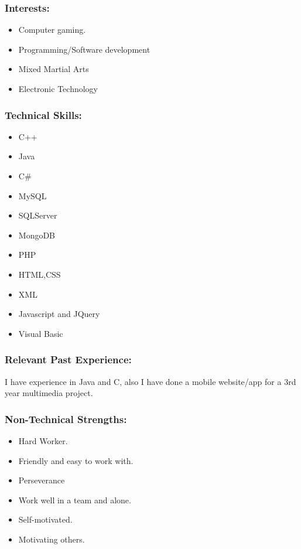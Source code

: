 \subsubsection{Interests:}
	\begin{itemize}
		\item Computer gaming.
		\item Programming/Software development
		\item Mixed Martial Arts
		\item Electronic Technology
	\end{itemize}
		
\subsubsection{Technical Skills:}
	\begin{itemize}
		\item C++
		\item Java
		\item	C\#
		\item	MySQL
		\item	SQLServer
		\item	MongoDB
		\item PHP
		\item HTML,CSS
		\item XML
		\item Javascript and JQuery
		\item Visual Basic 
	\end{itemize}

\subsubsection{Relevant Past Experience:}
	\par{I have experience in Java and C, also I have done a mobile website/app for a 3rd year multimedia project.}

\subsubsection{Non-Technical Strengths:}
	\begin{itemize}
		\item Hard Worker.
		\item Friendly and easy to work with.
		\item Perseverance
		\item Work well in a team and alone.
		\item Self-motivated.
		\item Motivating others.
	\end{itemize}

